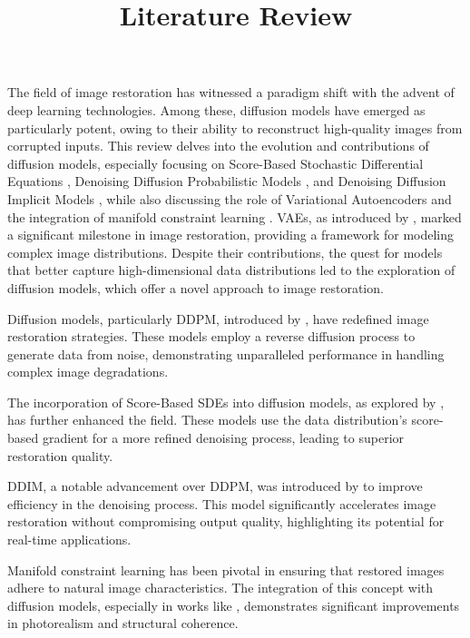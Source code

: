 
\begin{survey}
\label{cha:survey}

\title{Literature Review}
\maketitle



The field of image restoration has witnessed a paradigm shift with the advent of deep learning technologies. Among these, diffusion models have emerged as particularly potent, owing to their ability to reconstruct high-quality images from corrupted inputs. This review delves into the evolution and contributions of diffusion models, especially focusing on Score-Based Stochastic Differential Equations \cite{score_based_SDE}, Denoising Diffusion Probabilistic Models \cite{DDPM}, and Denoising Diffusion Implicit Models \cite{DDIM}, while also discussing the role of Variational Autoencoders \cite{VAE_diffusion} and the integration of manifold constraint learning \cite{MCG}.  VAEs, as introduced by \cite{vae_model}, marked a significant milestone in image restoration, providing a framework for modeling complex image distributions. Despite their contributions, the quest for models that better capture high-dimensional data distributions led to the exploration of diffusion models, which offer a novel approach to image restoration.       

Diffusion models, particularly DDPM, introduced by \cite{DDPM}, have redefined image restoration strategies. These models employ a reverse diffusion process to generate data from noise, demonstrating unparalleled performance in handling complex image degradations.    


The incorporation of Score-Based SDEs into diffusion models, as explored by \cite{score_based_SDE,song_2}, has further enhanced the field. These models use the data distribution's score-based gradient for a more refined denoising process, leading to superior restoration quality.    

DDIM, a notable advancement over DDPM, was introduced by \cite{DDIM} to improve efficiency in the denoising process. This model significantly accelerates image restoration without compromising output quality, highlighting its potential for real-time applications.   

Manifold constraint learning has been pivotal in ensuring that restored images adhere to natural image characteristics. The integration of this concept with diffusion models, especially in works like \cite{Inverse,PnP,MCG}, demonstrates significant improvements in photorealism and structural coherence.      



\end{survey}

